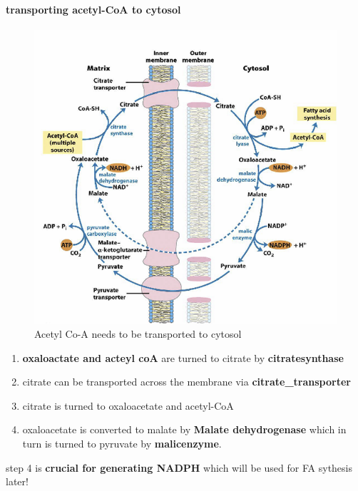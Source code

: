 \documentclass[../main.tex]{subfiles}
\begin{document}
\paragraph{transporting acetyl-CoA to cytosol}
\begin{figure}[H]
    \centering
    \includegraphics[width=0.6\linewidth]{actylCoA.png}
    \caption{Acetyl Co-A needs to be transported to cytosol}
    \label{fig:enter-label}
\end{figure}
\begin{enumerate}
    \item \textbf{oxaloactate and acteyl coA} are turned to citrate by \textbf{\gls{citratesynthase}}
    \item citrate can be transported across the membrane via \textbf{\gls{citrate_transporter}}
    \item citrate is turned to oxaloacetate and acetyl-CoA

    \item oxaloacetate is converted to malate by \textbf{Malate dehydrogenase} which in turn is turned to pyruvate by \textbf{\gls{malicenzyme}}. 
\end{enumerate}

step 4 is \textbf{crucial for generating NADPH} which will be used for FA sythesis later!
\end{document}

